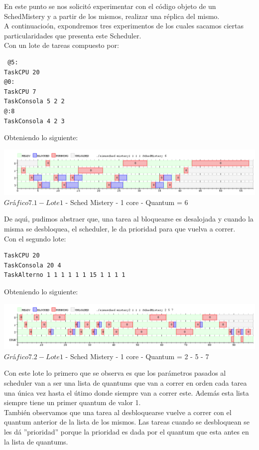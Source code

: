 \indent En este punto se nos solicit\'{o} experimentar con el c\'{o}digo objeto de un 
SchedMistery y a partir de los mismos, realizar una r\'{e}plica del mismo.\\

A continuacio\'{o}n, expondremos tres experimentos de los cuales sacamos ciertas particularidades que presenta este Scheduler.\\

Con un lote de tareas compuesto por:\\

\begin{verbatim}
 @5:
TaskCPU 20
@0:
TaskCPU 7
TaskConsola 5 2 2
@:8
TaskConsola 4 2 3
\end{verbatim}

Obteniendo lo siguiente:
\begin{center}
    	\includegraphics[width=450pt]{./Test/ej7_1.png}
	{$Gr$\'a$fico 7.1 - Lote 1$ - Sched Mistery - 1 core - Quantum = 6}	
 \end{center}
 
De aqu\'{\i}, pudimos abstraer que, una tarea al bloquearse es desalojada y cuando la misma se desbloquea, el scheduler, le da 
prioridad para que vuelva a correr.\\

Con el segundo lote:\\

\begin{verbatim}
TaskCPU 20
TaskConsola 20 4
TaskAlterno 1 1 1 1 1 1 15 1 1 1 1
\end{verbatim}

Obteniendo lo siguiente:
\begin{center}
    	\includegraphics[width=450pt]{./Test/ej7_2.png}
	{$Gr$\'a$fico 7.2 - Lote 1$ - Sched Mistery - 1 core - Quantum = 2 - 5 - 7}	
 \end{center}

Con este lote lo primero que se observa es que los par\'{a}metros pasados al scheduler van a ser una lista de quantums que 
van a correr en orden cada tarea una \'{u}nica vez hasta el \'{u}timo donde siempre van a correr este. Adem\'{a}s esta lista siempre 
tiene un primer quantum de valor 1.\\
Tambi\'{e}n observamos que una tarea al desbloquearse vuelve a correr con el quantum anterior de la lista de los mismos. 
Las tareas cuando se desbloquean se les d\'{a} ''prioridad'' porque la prioridad es dada por el quantum que esta antes en 
la lista de quantums.\\

